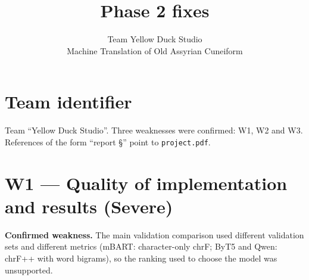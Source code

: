 \documentclass[a4paper,11pt]{article}
\title{Phase 2 fixes}
\author{Team Yellow Duck Studio\\ Machine Translation of Old Assyrian Cuneiform}
\date{}
\begin{document}
\maketitle

\section{Team identifier}
Team ``Yellow Duck Studio''. Three weaknesses were confirmed: W1, W2 and W3. References of the form ``report \S'' point to \texttt{project.pdf}.

\section{W1 --- Quality of implementation and results (Severe)}
\textbf{Confirmed weakness.} The main validation comparison used different validation sets and different metrics (mBART: character-only chrF; ByT5 and Qwen: chrF++ with word bigrams), so the ranking used to choose the model was unsupported.
\end{document}
